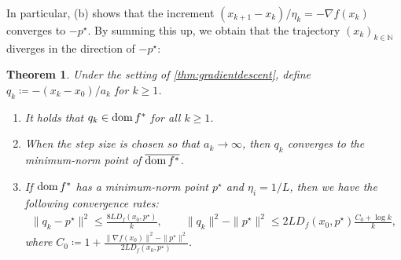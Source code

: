 \documentclass[11pt,a4paper]{article}
\theoremstyle{definition}
\theoremstyle{plain}
\newtheorem{thm}{Theorem}[section]
\newcommand{\NN}{{\mathbb{N}}}
\newcommand{\dom}{\mathop{\rm dom}}
\begin{document}
In particular, (b) shows that the increment $(x_{k + 1} - x_k)/\eta_k = -\nabla f(x_k)$ converges to $-p^\star$.
By summing this up, we obtain that the trajectory $(x_k)_{k \in \NN}$ diverges in the direction of $-p^\star$:

\begin{thm}
    Under the setting of \cref{thm:gradientdescent}, define $q_k \coloneqq -(x_k - x_0)/a_k$ for $k \ge 1$.
    \begin{enumerate}
        \item[(a)] It holds that $q_k \in \dom f^\ast$ for all $k \ge 1$.
        \item[(b)] When the step size is chosen so that $a_k \to \infty$, then $q_k$ converges to the minimum-norm point of $\overline{\dom f^\ast}$.
        \item[(c)] If $\dom f^\ast$ has a minimum-norm point $p^\star$ and $\eta_i = 1/L$, then we have the following convergence rates:
        \begin{gather*}
            \|q_k - p^\star\|^2 \le \frac{8LD_f(x_0, p^\star)}k,\qquad \|q_k\|^2 - \|p^\star\|^2 \le 2LD_f(x_0, p^\star)\frac{C_0 + \log k}k,
        \end{gather*}
        where $C_0 \coloneqq 1 + \frac{\|\nabla f(x_0)\|^2 - \|p^\star\|^2}{2LD_f(x_0, p^\star)}$.
    \end{enumerate}
\end{thm}
\end{document}
